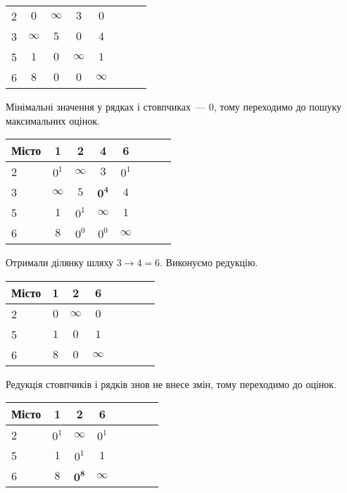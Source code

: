 \documentclass[a4paper,oneside,DIV=12,12pt]{scrartcl}
\begin{document}
\begin{solution}
\begin{longtable}[c]{lccccccr}
				2     & $0$      & $\infty$ & $3$      & $0$\\
				3     & $\infty$ & $5$      & $0$      & $4$\\
				5     & $1$      & $0$      & $\infty$ & $1$\\
				6     & $8$      & $0$      & $0$      & $\infty$\\
		\end{longtable}
		
		Мінімальні значення у рядках і стовпчиках~— $0$, тому переходимо до пошуку максимальних оцінок.
		
		\begin{longtable}[c]{lccccccr}
			\toprule
				Місто & 1 & 2 & 4 & 6 \\
			\midrule
			\endhead
			\bottomrule
			\endfoot
			
				2     & $0^1$    & $\infty$ & $3$            & $0^1$\\
				3     & $\infty$ & $5$      & $\mathbf{0^4}$ & $4$\\
				5     & $1$      & $0^1$    & $\infty$       & $1$\\
				6     & $8$      & $0^0$    & $0^0$          & $\infty$\\
		\end{longtable}
		
		Отримали ділянку шляху $3 \to 4 = 6$. Виконуємо редукцію.
		
		\begin{longtable}[c]{lccccccr}
			\toprule
				Місто & 1 & 2 & 6 \\
			\midrule
			\endhead
			\bottomrule
			\endfoot
			
				2     & $0$ & $\infty$ & $0$\\
				5     & $1$ & $0$      & $1$\\
				6     & $8$ & $0$      & $\infty$\\
		\end{longtable}
		
		Редукція стовпчиків і рядків знов не внесе змін, тому переходимо до оцінок.
		
		\begin{longtable}[c]{lccccccr}
			\toprule
				Місто & 1 & 2 & 6 \\
			\midrule
			\endhead
			\bottomrule
			\endfoot
			
				2     & $0^1$ & $\infty$       & $0^1$\\
				5     & $1$   & $0^1$          & $1$\\
				6     & $8$   & $\mathbf{0^8}$ & $\infty$\\
		\end{longtable}
		

\end{solution}
\end{document}
